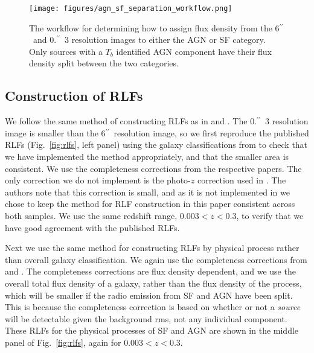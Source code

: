\documentclass[usenatbib,fleqn,letters]{mnras}
\newcommand{\sarc}{$^{\prime\prime}\!\!$}
\begin{document}
\begin{figure}
    \centering
    \texttt{[image: figures/agn\_sf\_separation\_workflow.png]}
    \caption{The workflow for determining how to assign flux density from the 6\sarc\ and 0.\sarc\ 3 resolution images to either the AGN or SF category. Only sources with a $T_b$ identified AGN component have their flux density split between the two categories.}
    \label{fig:flowchart}
\end{figure}

\subsection{Construction of RLFs}

We follow the same method of constructing RLFs as in \cite{kondapally_cosmic_2022} and \cite{cochrane_lofar_2023}. The 0.\sarc\ 3 resolution image is smaller than the 6\sarc\ resolution image, so we first reproduce the published RLFs (Fig.~\ref{fig:rlfs}, left panel) using the galaxy classifications from  to check that we have implemented the method appropriately, and that the smaller area is consistent. We use the completeness corrections from the respective papers. The only correction we do not implement is the photo-$z$ correction used in \cite{cochrane_lofar_2023}. The authors note that this correction is small, and as it is not implemented in \cite{kondapally_cosmic_2022} we chose to keep the method for RLF construction in this paper consistent across both samples. We use the same redshift range, $0.003 < z < 0.3$, to verify that we have good agreement with the published RLFs.

Next we use the same method for constructing RLFs by physical process rather than overall galaxy classification. We again use the completeness corrections from \cite{cochrane_lofar_2023} and \cite{kondapally_cosmic_2022}. The completeness corrections are flux density dependent, and we use the overall total flux density of a galaxy, rather than the flux density of the process, which will be smaller if the radio emission from SF and AGN have been split. This is because the completeness correction is based on whether or not a \textit{source} will be detectable given the background rms, not any individual component. 
These RLFs for the physical processes of SF and AGN are shown in the middle panel of Fig.~\ref{fig:rlfs}, again for  $0.003 < z < 0.3$. 
\end{document}
